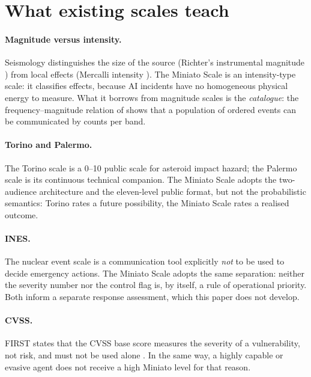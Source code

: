 \documentclass[11pt,a4paper]{article}
\begin{document}
\section{What existing scales teach}
\label{sec:related}

\paragraph{Magnitude versus intensity.} Seismology distinguishes the size of the source (Richter's instrumental magnitude \citep{richter1935}) from local effects (Mercalli intensity \citep{wood1931}). The Miniato Scale is an intensity-type scale: it classifies effects, because AI incidents have no homogeneous physical energy to measure. What it borrows from magnitude scales is the \emph{catalogue}: the frequency--magnitude relation of \citet{gutenberg1944} shows that a population of ordered events can be communicated by counts per band.

\paragraph{Torino and Palermo.} The Torino scale \citep{binzel2000torino} is a 0--10 public scale for asteroid impact hazard; the Palermo scale \citep{chesley2002palermo} is its continuous technical companion. The Miniato Scale adopts the two-audience architecture and the eleven-level public format, but not the probabilistic semantics: Torino rates a future possibility, the Miniato Scale rates a realised outcome.

\paragraph{INES.} The nuclear event scale \citep{iaea2013ines} is a communication tool explicitly \emph{not} to be used to decide emergency actions. The Miniato Scale adopts the same separation: neither the severity number nor the control flag is, by itself, a rule of operational priority. Both inform a separate response assessment, which this paper does not develop.

\paragraph{CVSS.} FIRST states that the CVSS base score measures the severity of a vulnerability, not risk, and must not be used alone \citep{first2023cvss4}. In the same way, a highly capable or evasive agent does not receive a high Miniato level for that reason.
\end{document}

